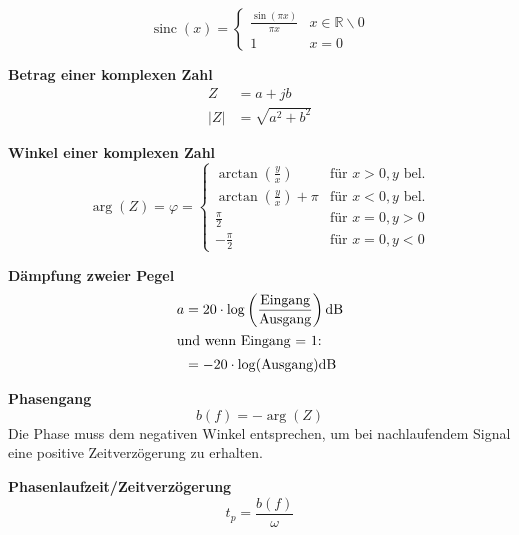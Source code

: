 \documentclass[12pt, a4paper, twoside]{scrartcl}
\begin{document}
\begin{minipage}{.5\linewidth}
  \[
    \operatorname{sinc}(x)=
    \begin{cases}
      \frac{\sin(\pi x)}{\pi x} & x \in\mathbb{R} \backslash 0\\
      1 & x = 0
    \end{cases}
  \]
\end{minipage}%
\begin{minipage}{.5\linewidth}
  \begin{center}
  \end{center}
\end{minipage}

\textbf{Betrag einer komplexen Zahl}
\begin{align*}
  Z &= a + jb\\
  |Z| &= \sqrt{a^2 +b^2}
\end{align*}

\textbf{Winkel einer komplexen Zahl}
\[\arg (Z) = \varphi =
  \begin{cases}
    \arctan \left(\frac{y}{x}\right) & \text{für } x>0, y \text{ bel.}\\
    \arctan \left(\frac{y}{x}\right) + \pi & \text{für } x<0, y \text{ bel.}\\
    \frac{\pi}{2} & \text{für } x = 0, y > 0\\
    - \frac{\pi}{2} & \text{für } x = 0,y < 0
  \end{cases}\]

\textbf{Dämpfung zweier Pegel}
\begin{align*}
  a &= 20 \cdot \log \left(\frac{\text{Eingang}}{\text{Ausgang}} \right) \si{\decibel}\\
  \intertext{und wenn Eingang = 1:}
  &= -20 \cdot \log(\text{Ausgang}) \si{\decibel}
\end{align*}

\textbf{Phasengang}
\[b(f) = -\arg(Z)\]
Die Phase muss dem negativen Winkel entsprechen, um bei nachlaufendem Signal eine positive Zeitverzögerung zu erhalten.

\textbf{Phasenlaufzeit/Zeitverzögerung}
\[t_p = \frac{b(f)}{\omega}\]
\end{document}
